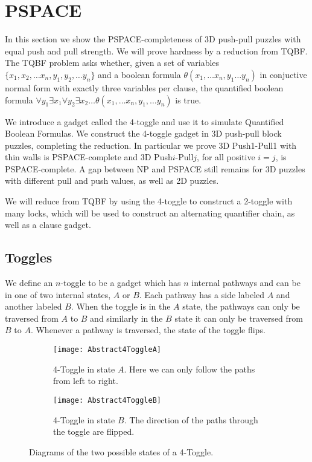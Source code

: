 \section{PSPACE}
\label{3DPSPACE}
In this section we show the PSPACE-completeness of 3D push-pull puzzles with equal push and pull strength. We will prove hardness by a reduction from TQBF. The TQBF problem asks whether, given a set of variables $\{x_1, x_2, \ldots x_n, y_1, y_2, \ldots y_n\}$ and a boolean formula $\theta(x_1, \ldots x_n, y_1 \ldots y_n)$ in conjuctive normal form with exactly three variables per clause, the quantified boolean formula $\forall y_1 \exists x_1 \forall y_2 \exists x_2 \ldots \theta(x_1, \ldots x_n, y_1, \ldots y_n)$ is true.

We introduce a gadget called the 4-toggle and use it to simulate Quantified Boolean Formulas\cite{NPBook}. We construct the 4-toggle gadget in 3D push-pull block puzzles, completing the reduction. In particular we prove 3D Push1-Pull1 with thin walls is PSPACE-complete and 3D Push$i$-Pull$j$, for all positive $i=j$, is PSPACE-complete. A gap between NP and PSPACE still remains for 3D puzzles with different pull and push values, as well as 2D puzzles. 

We will reduce from TQBF by using the 4-toggle to construct a 2-toggle with many locks, which will be used to construct an alternating quantifier chain, as well as a clause gadget.

\subsection{Toggles}
We define an $n$-toggle to be a gadget which has $n$ internal pathways and can be in one of two internal states, $A$ or $B$. Each pathway has a side labeled $A$ and another labeled $B$. When the toggle is in the $A$ state, the pathways can only be traversed from $A$ to $B$ and similarly in the $B$ state it can only be traversed from $B$ to $A$. Whenever a pathway is traversed, the state of the toggle flips.

\begin{figure}[!ht]
\centering
\begin{subfigure}[t]{0.45\textwidth}
  \centering
    \texttt{[image: Abstract4ToggleA]}
    \caption{4-Toggle in state $A$. Here we can only follow the paths from left to right.}
    \label{fig:Abstract4ToggleA}
\end{subfigure}
\begin{subfigure}[t]{0.45\textwidth}
  \centering
    \texttt{[image: Abstract4ToggleB]}
    \caption{4-Toggle in state $B$. The direction of the paths through the toggle are flipped.}
    \label{fig:Abstract4ToggleB}
\end{subfigure}
\caption{Diagrams of the two possible states of a 4-Toggle.}
\end{figure}

